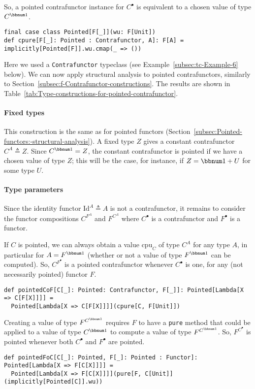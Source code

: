 So, a pointed contrafunctor instance for $C^{\bullet}$ is equivalent
to a chosen value of type $C^{\bbnum 1}$.
\begin{lstlisting}
final case class Pointed[F[_]](wu: F[Unit])
def cpure[F[_]: Pointed : Contrafunctor, A]: F[A] = implicitly[Pointed[F]].wu.cmap(_ => ())
\end{lstlisting}
Here we used a \lstinline!Contrafunctor! typeclass (see Example~\ref{subsec:tc-Example-6}
below). We can now apply structural analysis to pointed contrafunctors,
similarly to Section~\ref{subsec:f-Contrafunctor-constructions}.
The results are shown in Table~\ref{tab:Type-constructions-for-pointed-contrafunctor}.

\paragraph{Fixed types}

This construction is the same as for pointed functors (Section~\ref{subsec:Pointed-functors:-structural-analysis}).
A fixed type $Z$ gives a constant contrafunctor $C^{A}\triangleq Z$.
Since $C^{\bbnum 1}=Z$, the constant contrafunctor is pointed if
we have a chosen value of type $Z$; this will be the case, for instance,
if $Z=\bbnum 1+U$ for some type $U$. 

\paragraph{Type parameters}

Since the identity functor $\text{Id}^{A}\triangleq A$ is not a contrafunctor,
it remains to consider the functor compositions $C^{F^{A}}$ and $F^{C^{A}}$
where $C^{\bullet}$ is a contrafunctor and $F^{\bullet}$ is a functor. 

If $C$ is pointed, we can always obtain a value $\text{cpu}_{C}$
of type $C^{A}$ for any type $A$, in particular for $A=F^{\bbnum 1}$
(whether or not a value of type $F^{\bbnum 1}$ can be computed).
So, $C^{F^{\bullet}}$ is a pointed contrafunctor whenever $C^{\bullet}$
is one, for any (not necessarily pointed) functor $F$.
\begin{lstlisting}
def pointedCoF[C[_]: Pointed: Contrafunctor, F[_]]: Pointed[Lambda[X => C[F[X]]]] =
  Pointed[Lambda[X => C[F[X]]]](cpure[C, F[Unit]])
\end{lstlisting}

Creating a value of type $F^{C^{\bbnum 1}}$ requires $F$ to have
a \lstinline!pure! method that could be applied to a value of type
$C^{\bbnum 1}$ to compute a value of type $F^{C^{\bbnum 1}}$. So,
$F^{C^{\bullet}}$ is pointed whenever both $C^{\bullet}$ and $F^{\bullet}$
are pointed.
\begin{lstlisting}
def pointedFoC[C[_]: Pointed, F[_]: Pointed : Functor]: Pointed[Lambda[X => F[C[X]]]] =
  Pointed[Lambda[X => F[C[X]]]](pure[F, C[Unit]](implicitly[Pointed[C]].wu))
\end{lstlisting}



